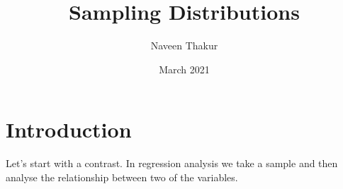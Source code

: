 \documentclass{article}
\title{Sampling Distributions}
\author{Naveen Thakur }
\date{March 2021}
\begin{document}
\maketitle

\section{Introduction}
Let's start with a contrast. In regression analysis we take a sample and then analyse the relationship between two of the variables. 
\end{document}
